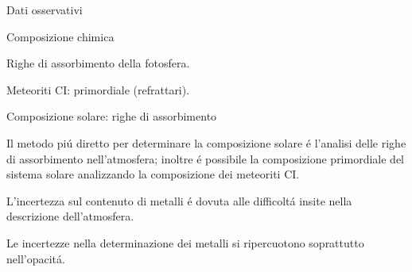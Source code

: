\documentclass[10pt,xcolor={usenames},fleqn,mathserif,serif]{beamer}
\begin{document}
\begin{frame}{Dati osservativi}

\begin{block}{Composizione chimica}

Righe di assorbimento della fotosfera.

Meteoriti CI: primordiale (refrattari).

\end{block}


\begin{table}[]

\label{tab:Zhistory}
\end{table}

\end{frame}

\begin{wordonframe}{Composizione solare: righe di assorbimento}

Il metodo pi\'u diretto per determinare la composizione solare \'e l'analisi delle righe di assorbimento nell'atmosfera; inoltre \'e possibile la composizione primordiale del sistema solare analizzando la composizione dei meteoriti CI.

L'incertezza sul contenuto di metalli \'e dovuta alle difficolt\'a insite nella descrizione dell'atmosfera.

Le incertezze nella determinazione dei metalli si ripercuotono soprattutto nell'opacit\'a.

\end{wordonframe}
\end{document}
